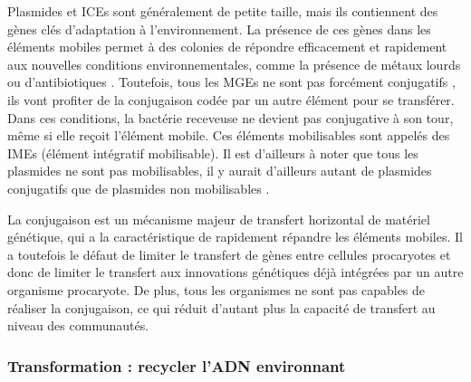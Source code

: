 Plasmides et ICEs sont généralement de petite taille, mais ils contiennent des gènes clés d'adaptation à l'environnement. La présence de ces gènes dans les éléments mobiles permet à des colonies de répondre efficacement et rapidement aux nouvelles conditions environnementales, comme la présence de métaux lourds ou d'antibiotiques \cite{botelho_role_2021}. Toutefois, tous les MGEs ne sont pas forcément conjugatifs \cite{valentine_mobilization_1988}, ils vont profiter de la conjugaison codée par un autre élément pour se transférer. Dans ces conditions, la bactérie receveuse ne devient pas conjugative à son tour, même si elle reçoit l'élément mobile. Ces éléments mobilisables sont appelés des IMEs (élément intégratif mobilisable). Il est d'ailleurs à noter que tous les plasmides ne sont pas mobilisables, il y aurait d'ailleurs autant de plasmides conjugatifs que de plasmides non mobilisables \cite{smillie_mobility_2010}.

La conjugaison est un mécanisme majeur de transfert horizontal de matériel génétique, qui a la caractéristique de rapidement répandre les éléments mobiles. Il a toutefois le défaut de limiter le transfert de gènes entre cellules procaryotes et donc de limiter le transfert aux innovations génétiques déjà intégrées par un autre organisme procaryote. De plus, tous les organismes ne sont pas capables de réaliser la conjugaison, ce qui réduit d'autant plus la capacité de transfert au niveau des communautés. 
\newpage
\subsubsection{Transformation : recycler l'ADN environnant}


